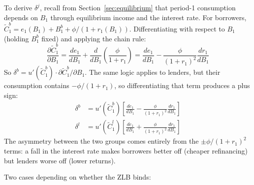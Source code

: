 \documentclass[11pt,a4paper]{article}
\begin{document}
To derive $\delta^j$, recall from Section~\ref{sec:equilibrium} that period-1 consumption depends on $B_1$ through equilibrium income and the interest rate. For borrowers, $\tilde{C}_1^b = e_1(B_1) + B_1^b + \phi/(1+r_1(B_1))$. Differentiating with respect to $B_1$ (holding $B_1^b$ fixed) and applying the chain rule:
\begin{equation}
\frac{\partial \tilde{C}_1^b}{\partial B_1} = \frac{de_1}{dB_1} + \frac{d}{dB_1}\!\left(\frac{\phi}{1+r_1}\right) = \frac{de_1}{dB_1} - \frac{\phi}{(1+r_1)^2}\frac{dr_1}{dB_1}
\end{equation}
So $\delta^b = u'(\tilde{C}_1^b) \cdot \partial \tilde{C}_1^b/\partial B_1$. The same logic applies to lenders, but their consumption contains $-\phi/(1+r_1)$, so differentiating that term produces a plus sign:
\begin{equation}
\begin{aligned}
\delta^b &= u'(\tilde{C}_1^b)\left[\frac{de_1}{dB_1} - \frac{\phi}{(1+r_1)^2}\frac{dr_1}{dB_1}\right] \\
\delta^l &= u'(\tilde{C}_1^l)\left[\frac{de_1}{dB_1} + \frac{\phi}{(1+r_1)^2}\frac{dr_1}{dB_1}\right]
\end{aligned}
\end{equation}
The asymmetry between the two groups comes entirely from the $\pm\phi/(1+r_1)^2$ terms: a fall in the interest rate makes borrowers better off (cheaper refinancing) but lenders worse off (lower returns).

Two cases depending on whether the ZLB binds:
\end{document}
